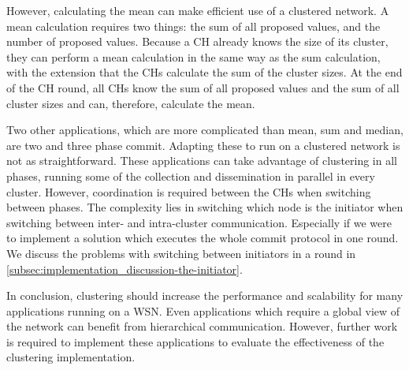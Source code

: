 \begin{newtext}
However, calculating the mean can make efficient use of a clustered network. A mean calculation requires two things: the sum of all proposed values, and the number of proposed values. Because a CH already knows the size of its cluster, they can perform a mean calculation in the same way as the sum calculation, with the extension that the CHs calculate the sum of the cluster sizes. At the end of the CH round, all CHs know the sum of all proposed values and the sum of all cluster sizes and can, therefore, calculate the mean.

Two other applications, which are more complicated than mean, sum and median, are two and three phase commit. Adapting these to run on a clustered network is not as straightforward. These applications can take advantage of clustering in all phases, running some of the collection and dissemination in parallel in every cluster. However, coordination is required between the CHs when switching between phases. The complexity lies in switching which node is the initiator when switching between inter- and intra-cluster communication. Especially if we were to implement a solution which executes the whole commit protocol in one round. We discuss the problems with switching between initiators in a round in \cref{subsec:implementation_discussion-the-initiator}.

In conclusion, clustering should increase the performance and scalability for many applications running on a WSN. Even applications which require a global view of the network can benefit from hierarchical communication. However, further work is required to implement these applications to evaluate the effectiveness of the clustering implementation.

\end{newtext}


